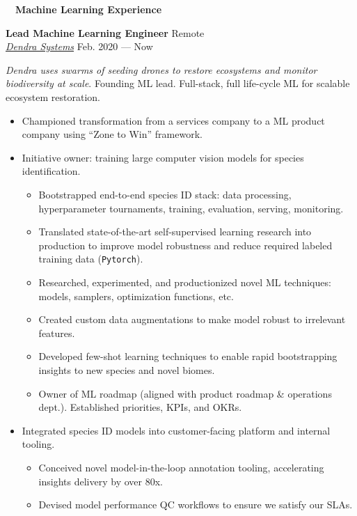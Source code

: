 \documentclass[a4paper,12pt]{article}
\newcommand{\resheading}[1]{{\hspace{-9pt} \colorbox{mygrey}{\begin{minipage}{\textwidth}{\textmd{~~\large \textbf{#1} \vphantom{p\^{E}}}}\end{minipage}}\vspace{6pt}} }
\newcommand{\ressubheading}[4]{{\begin{minipage}{\textwidth}
                                    \textbf{#1} \hfill #2 \\
                                    \textit{#3} \hfill #4 \\
\end{minipage}}}
\begin{document}
    \resheading{Machine Learning Experience}


    \ressubheading{Lead Machine Learning Engineer}{Remote}{\href{dendra.io}{Dendra Systems}}{Feb. 2020 --- Now}

    \vspace{-6pt} \textit{Dendra uses swarms of seeding drones to restore ecosystems and monitor biodiversity at scale}. Founding ML lead. Full-stack, full life-cycle ML for scalable ecosystem restoration.
    \begin{itemize}
        \item Championed transformation from a services company to a ML product company using ``Zone to Win'' framework.
        \item Initiative owner: training large computer vision models for species identification.
        \begin{itemize}
            \item Bootstrapped end-to-end species ID stack: data processing, hyperparameter tournaments, training, evaluation, serving, monitoring.
            \item Translated state-of-the-art self-supervised learning research into production to improve model robustness and reduce required labeled training data (\texttt{Pytorch}).
            \item Researched, experimented, and productionized novel ML techniques: models, samplers, optimization functions, etc.
            \item Created custom data augmentations to make model robust to irrelevant features.
            \item Developed few-shot learning techniques to enable rapid bootstrapping insights to new species and novel biomes.
            \item Owner of ML roadmap (aligned with product roadmap \& operations dept.). Established priorities, KPIs, and OKRs.
        \end{itemize}
        \item Integrated species ID models into customer-facing platform and internal tooling.
        \begin{itemize}
            \item Conceived novel model-in-the-loop annotation tooling, accelerating insights delivery by over 80x.
            \item Devised model performance QC workflows to ensure we satisfy our SLAs.
        \end{itemize}

\end{itemize}
\end{document}
